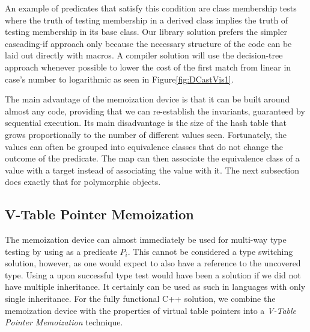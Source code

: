 \noindent
An example of predicates that satisfy this condition are class membership tests
where the truth of testing membership in a derived class implies 
the truth of testing membership in its base class. Our library 
solution prefers the simpler cascading-if approach only because the necessary 
structure of the code can be laid out directly with macros. A compiler solution 
will use the decision-tree approach whenever possible to lower the cost of the 
first match from linear in case's number to logarithmic as seen in Figure\ref{fig:DCastVis1}.


The main advantage of the memoization device is that it can be built around 
almost any code, providing that we can re-establish the invariants, guaranteed 
by sequential execution. Its main disadvantage is the size of the hash table 
that grows proportionally to the number of different values seen. Fortunately, 
the values can often be grouped into equivalence classes that do not change the 
outcome of the predicate. The map can then associate the equivalence class of a 
value with a target instead of associating the value with it. The next 
subsection does exactly that for polymorphic objects.

\subsection{V-Table Pointer Memoization}
\label{sec:vtblmem}

The memoization device can almost immediately be used for multi-way type testing by 
using  as a predicate $P_i$. This cannot be considered a 
type switching solution, however, as one would expect to also have a reference 
to the uncovered type. Using a  upon successful type test 
would have been a solution if we did not have multiple inheritance. It certainly 
can be used as such in languages with only single inheritance. For the fully 
functional C++ solution, we combine the memoization device with the properties 
of virtual table pointers into a \emph{V-Table Pointer Memoization} technique.

